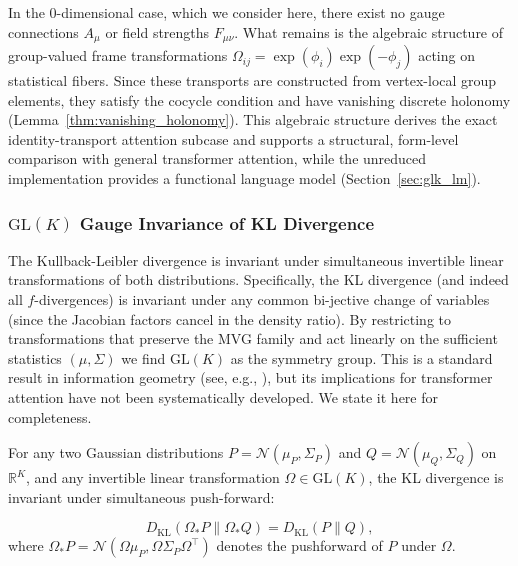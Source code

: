 \documentclass[twoside,11pt]{article}
\begin{document}
In the 0-dimensional case, which we consider here, there exist no gauge connections $A_\mu$ or field strengths $F_{\mu\nu}$. What remains is the algebraic structure of group-valued frame transformations $\Omega_{ij} = \exp(\phi_i)\exp(-\phi_j)$ acting on statistical fibers. Since these transports are constructed from vertex-local group elements, they satisfy the cocycle condition and have vanishing discrete holonomy (Lemma~\ref{thm:vanishing_holonomy}). This algebraic structure derives the exact identity-transport attention subcase and supports a structural, form-level comparison with general transformer attention, while the unreduced implementation provides a functional language model (Section~\ref{sec:glk_lm}).


\subsubsection{$\mathrm{GL}(K)$ Gauge Invariance of KL Divergence}
\label{sec:glk_invariance}

The Kullback-Leibler divergence is invariant under simultaneous invertible linear transformations of both distributions. Specifically, the KL divergence (and indeed all $f$-divergences) is invariant under any common bi-jective change of variables (since the Jacobian factors cancel in the density ratio). By restricting to transformations that preserve the MVG family and act linearly on the sufficient statistics $(\mu, \Sigma)$ we find $\mathrm{GL}(K)$ as the symmetry group. This is a standard result in information geometry (see, e.g., \citet{Amari2016}), but its implications for transformer attention have not been systematically developed. We state it here for completeness.

\begin{theorem}
\label{thm:glk_invariance}
For any two Gaussian distributions $P = \mathcal{N}(\mu_P, \Sigma_P)$ and $Q = \mathcal{N}(\mu_Q, \Sigma_Q)$ on $\mathbb{R}^K$, and any invertible linear transformation $\Omega \in \mathrm{GL}(K)$, the KL divergence is invariant under simultaneous push-forward:

\begin{equation}
D_{\mathrm{KL}}(\Omega_* P \| \Omega_* Q) = D_{\mathrm{KL}}(P \| Q),
\label{eq:glk_invariance}
\end{equation}
where $\Omega_* P = \mathcal{N}(\Omega\mu_P, \Omega\Sigma_P\Omega^\top)$ denotes the pushforward of $P$ under $\Omega$.
\end{theorem}
\end{document}
